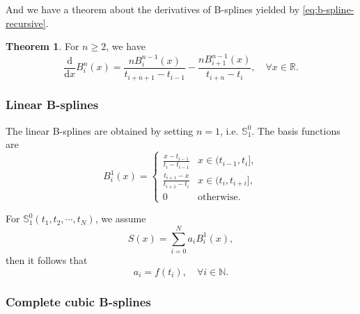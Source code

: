 \documentclass[a4paper]{article}
\theoremstyle{definition}
\newtheorem{theorem}{Theorem}
\begin{document}
\vspace{1em}
And we have a theorem about the derivatives of B-splines yielded by \cref{eq:b-spline-recursive}.
\begin{theorem}
  For $n \geqslant 2$, we have 
  \begin{equation}
    \frac{\mathrm{d}}{\mathrm{d}x}B_i^n(x) = \frac{nB_i^{n - 1}(x)}{t_{i + n + 1} - t_{i - 1}} - \frac{nB_{i + 1}^{n - 1}(x)}{t_{i + n} - t_i}, \quad \forall x \in \mathbb{R}.
    \label{eq:b-spline-derivative}
  \end{equation}
\end{theorem}

\subsubsection{Linear B-splines}

The linear B-splines are obtained by setting $n = 1$, i.e. $\mathbb{S}_1^0$. The basis functions are 
\begin{equation}
  B_i^1(x) = \begin{cases}
    \frac{x - t_{i - 1}}{t_i - t_{i - 1}} & x \in (t_{i - 1}, t_i], \\
    \frac{t_{i + 1} - x}{t_{i + 1} - t_i} & x \in (t_i, t_{i + i}], \\
    0 & \text{otherwise}.
  \end{cases}
  \label{eq:linear-b-spline}
\end{equation}

For $\mathbb{S}_1^0(t_1, t_2, \cdots, t_N)$, we assume 
\begin{equation}
  S(x) = \sum_{i = 0}^N a_i B_i^1(x),
  \label{eq:linear-b-spline-form}
\end{equation}
then it follows that 
\begin{equation}
  a_i = f(t_i), \quad \forall i \in \mathbb{N}.
  \label{eq:linear-b-spline-coefficients}
\end{equation}

\subsubsection{Complete cubic B-splines}
\label{sec:complete-cubic-b-splines}
\end{document}
